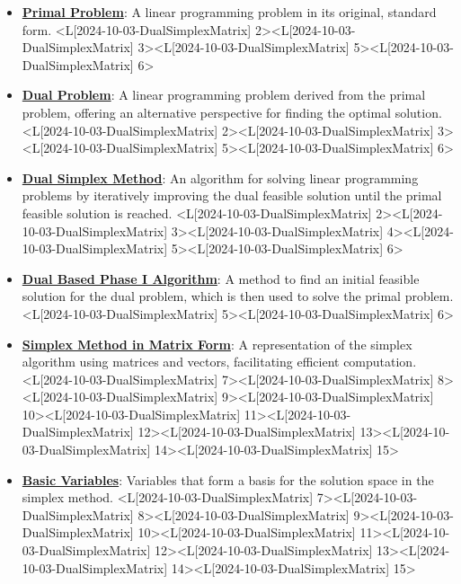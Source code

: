 \documentclass{article}%
\begin{document}
\begin{itemize}[[leftmargin=*]]%
\item \href{https://www.math.purdue.edu/~yipn/421/2024-10-03-DualSimplexMatrix.pdf#page=2}{\textbf{Primal Problem}}: A linear programming problem in its original, standard form. <L[2024-10-03-DualSimplexMatrix] 2><L[2024-10-03-DualSimplexMatrix] 3><L[2024-10-03-DualSimplexMatrix] 5><L[2024-10-03-DualSimplexMatrix] 6>%
\item \href{https://www.math.purdue.edu/~yipn/421/2024-10-03-DualSimplexMatrix.pdf#page=2}{\textbf{Dual Problem}}: A linear programming problem derived from the primal problem, offering an alternative perspective for finding the optimal solution. <L[2024-10-03-DualSimplexMatrix] 2><L[2024-10-03-DualSimplexMatrix] 3><L[2024-10-03-DualSimplexMatrix] 5><L[2024-10-03-DualSimplexMatrix] 6>%
\item \href{https://www.math.purdue.edu/~yipn/421/2024-10-03-DualSimplexMatrix.pdf#page=2}{\textbf{Dual Simplex Method}}: An algorithm for solving linear programming problems by iteratively improving the dual feasible solution until the primal feasible solution is reached. <L[2024-10-03-DualSimplexMatrix] 2><L[2024-10-03-DualSimplexMatrix] 3><L[2024-10-03-DualSimplexMatrix] 4><L[2024-10-03-DualSimplexMatrix] 5><L[2024-10-03-DualSimplexMatrix] 6>%
\item \href{https://www.math.purdue.edu/~yipn/421/2024-10-03-DualSimplexMatrix.pdf#page=5}{\textbf{Dual Based Phase I Algorithm}}: A method to find an initial feasible solution for the dual problem, which is then used to solve the primal problem. <L[2024-10-03-DualSimplexMatrix] 5><L[2024-10-03-DualSimplexMatrix] 6>%
\item \href{https://www.math.purdue.edu/~yipn/421/2024-10-03-DualSimplexMatrix.pdf#page=7}{\textbf{Simplex Method in Matrix Form}}: A representation of the simplex algorithm using matrices and vectors, facilitating efficient computation. <L[2024-10-03-DualSimplexMatrix] 7><L[2024-10-03-DualSimplexMatrix] 8><L[2024-10-03-DualSimplexMatrix] 9><L[2024-10-03-DualSimplexMatrix] 10><L[2024-10-03-DualSimplexMatrix] 11><L[2024-10-03-DualSimplexMatrix] 12><L[2024-10-03-DualSimplexMatrix] 13><L[2024-10-03-DualSimplexMatrix] 14><L[2024-10-03-DualSimplexMatrix] 15>%
\item \href{https://www.math.purdue.edu/~yipn/421/2024-10-03-DualSimplexMatrix.pdf#page=7}{\textbf{Basic Variables}}: Variables that form a basis for the solution space in the simplex method. <L[2024-10-03-DualSimplexMatrix] 7><L[2024-10-03-DualSimplexMatrix] 8><L[2024-10-03-DualSimplexMatrix] 9><L[2024-10-03-DualSimplexMatrix] 10><L[2024-10-03-DualSimplexMatrix] 11><L[2024-10-03-DualSimplexMatrix] 12><L[2024-10-03-DualSimplexMatrix] 13><L[2024-10-03-DualSimplexMatrix] 14><L[2024-10-03-DualSimplexMatrix] 15>%

\end{itemize}
\end{document}
